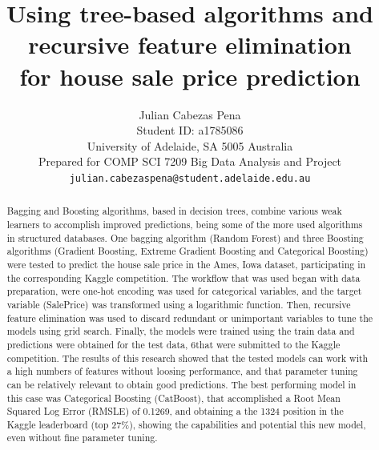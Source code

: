 \documentclass[11pt,onecolumn,titlepage,letterpaper]{article}
\begin{document}
\title{Using tree-based algorithms and recursive feature elimination \\ for house sale price prediction }

\author{Julian Cabezas Pena\\
Student ID: a1785086\\
University of Adelaide, SA 5005 Australia\\
Prepared for COMP SCI 7209 Big Data Analysis and Project \\
{\tt\small julian.cabezaspena@student.adelaide.edu.au}
}

\maketitle

\begin{abstract}
Bagging and Boosting algorithms, based in decision trees, combine various weak learners to accomplish improved predictions, being some of the more used algorithms in structured databases. One bagging algorithm (Random Forest) and three Boosting algorithms (Gradient Boosting, Extreme Gradient Boosting and Categorical Boosting) were tested to predict the house sale price in the Ames, Iowa dataset, participating in the corresponding Kaggle competition. The workflow that was used began with data preparation, were one-hot encoding was used for categorical variables, and the target variable (SalePrice) was transformed using a logarithmic function. Then, recursive feature elimination was used to discard redundant or unimportant variables to tune the models using grid search. Finally, the models were trained using the train data and predictions were obtained for the test data, 6that were submitted to the Kaggle competition.
The results of this research showed that the tested models can work with a high numbers of features without loosing performance, and that parameter tuning can be relatively relevant to obtain good predictions. The best performing model in this case was Categorical Boosting (CatBoost), that accomplished a Root Mean Squared Log Error (RMSLE) of 0.1269, and obtaining a the 1324 position in the Kaggle leaderboard (top 27\%), showing the capabilities and potential this new model, even without fine parameter tuning.
\end{abstract}
\end{document}
